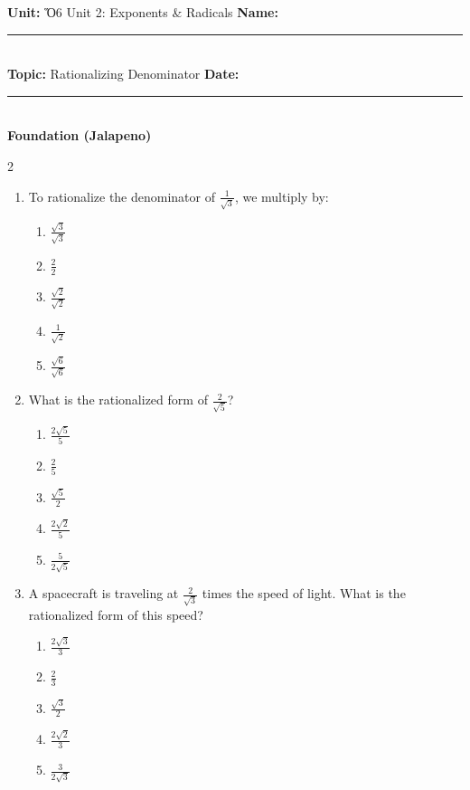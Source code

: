 \documentclass[10pt]{article}
\begin{document}
\enlargethispage{2.5cm}

\begin{tcolorbox}[colback=mainblue!5, colframe=mainblue, sharp corners, boxrule=0.5pt]
    \small \textbf{Unit:} Ὅ6 Unit 2: Exponents & Radicals \hfill \textbf{Name:} \rule{3cm}{0.4pt} \\
    \small \textbf{Topic:} Rationalizing Denominator \hfill \textbf{Date:} \rule{2cm}{0.4pt} \\
    \centering \textbf{\large Foundation (Jalapeno)}
\end{tcolorbox}

\vspace{0.2cm}

\begin{multicols}{2}
\begin{enumerate}[label=\textbf{Q\arabic*.}, leftmargin=*, itemsep=6pt, parsep=0pt]

  \item \small To rationalize the denominator of $\frac{1}{\sqrt{3}}$, we multiply by:
  \begin{enumerate}[label=(\Alph*), leftmargin=0.6cm, nosep, itemsep=2pt]
    \item $\frac{\sqrt{3}}{\sqrt{3}}$
    \item $\frac{2}{2}$
    \item $\frac{\sqrt{2}}{\sqrt{2}}$
    \item $\frac{1}{\sqrt{2}}$
    \item $\frac{\sqrt{6}}{\sqrt{6}}$
  \end{enumerate}

  \item \small What is the rationalized form of $\frac{2}{\sqrt{5}}$?
  \begin{enumerate}[label=(\Alph*), leftmargin=0.6cm, nosep, itemsep=2pt]
    \item $\frac{2\sqrt{5}}{5}$
    \item $\frac{2}{5}$
    \item $\frac{\sqrt{5}}{2}$
    \item $\frac{2\sqrt{2}}{5}$
    \item $\frac{5}{2\sqrt{5}}$
  \end{enumerate}

  \item \small A spacecraft is traveling at $\frac{2}{\sqrt{3}}$ times the speed of light. What is the rationalized form of this speed?
  \begin{enumerate}[label=(\Alph*), leftmargin=0.6cm, nosep, itemsep=2pt]
    \item $\frac{2\sqrt{3}}{3}$
    \item $\frac{2}{3}$
    \item $\frac{\sqrt{3}}{2}$
    \item $\frac{2\sqrt{2}}{3}$
    \item $\frac{3}{2\sqrt{3}}$
  \end{enumerate}


\end{enumerate}
\end{multicols}
\end{document}

